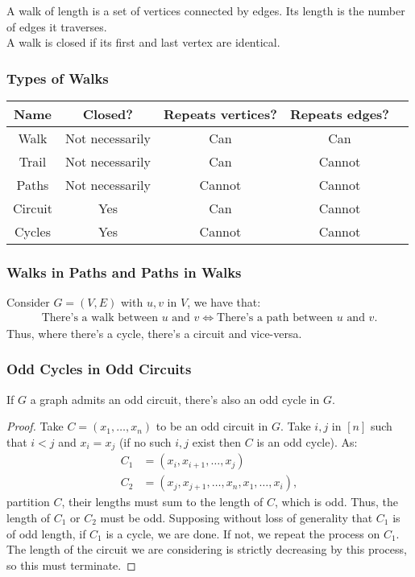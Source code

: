 A walk of length is a set of vertices connected by edges.
Its length is the number of edges it traverses.
\\[\baselineskip]
A walk is closed if its first and last vertex are identical.

\subsubsection{Types of Walks}

\begin{center}
    \begin{tabular} {| c | c | c | c | c |}
        \hline
        Name & Closed? & Repeats vertices? & Repeats edges? \\
        \hline \hline
        Walk        & Not necessarily & Can    & Can    \\ \hline
        Trail       & Not necessarily & Can    & Cannot \\ \hline
        Paths       & Not necessarily & Cannot & Cannot \\ \hline
        Circuit     & Yes             & Can    & Cannot \\ \hline
        Cycles      & Yes             & Cannot & Cannot \\ \hline
    \end{tabular}
\end{center}

\subsubsection{Walks in Paths and Paths in Walks}

Consider $G = (V, E)$ with $u, v$ in $V$, we have that:
\begin{gather*}
  \text{There's a walk between } u \text{ and } v
  \Longleftrightarrow
  \text{There's a path between } u \text{ and } v.
\end{gather*} Thus, where there's a cycle, there's a circuit
and vice-versa.

\subsubsection{Odd Cycles in Odd Circuits} \label{oddcycles}

If $G$ a graph admits an odd circuit, there's also
an odd cycle in $G$.
\begin{proof}
  Take $C = (x_1, \ldots, x_n)$ to be an odd circuit in $G$.
  Take $i, j$ in $[n]$ such that $i < j$ and $x_i = x_j$ (if no
  such $i, j$ exist then $C$ is an odd cycle). As: \begin{align*}
    C_1 &= (x_i, x_{i + 1}, \ldots, x_j) \\
    C_2 &= (x_j, x_{j + 1}, \ldots, x_n, x_1, \ldots, x_i),
  \end{align*} partition $C$, their lengths must sum to
  the length of $C$, which is odd. Thus, the length of
  $C_1$ or $C_2$ must be odd. Supposing without loss of generality
  that $C_1$ is of odd length, if $C_1$ is a cycle, we are done.
  If not, we repeat the process on $C_1$. The length of the circuit 
  we are considering is strictly decreasing by this process, 
  so this must terminate.
\end{proof}

